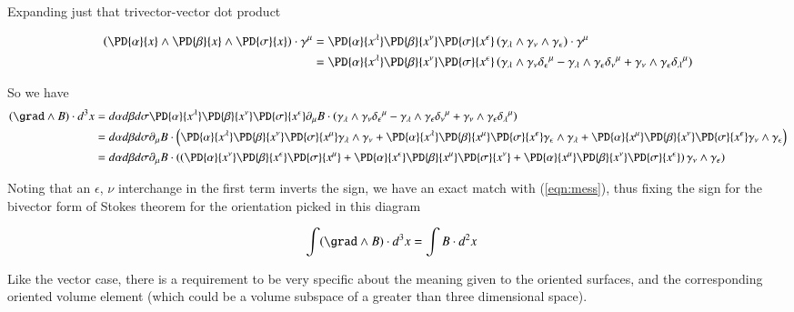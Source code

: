 Expanding just that trivector-vector dot product

\begin{align*}
\left( \PD{\alpha}{x} \wedge \PD{\beta}{x} \wedge \PD{\sigma}{x} \right) \cdot \gamma^\mu &= \PD{\alpha}{x^\lambda} \PD{\beta}{x^\nu} \PD{\sigma}{x^\epsilon} \left( \gamma_\lambda \wedge \gamma_\nu \wedge \gamma_\epsilon \right) \cdot \gamma^\mu  \\ &= \PD{\alpha}{x^\lambda} \PD{\beta}{x^\nu} \PD{\sigma}{x^\epsilon} \left( \gamma_\lambda \wedge \gamma_\nu {\delta_\epsilon}^\mu -\gamma_\lambda \wedge \gamma_\epsilon {\delta_\nu}^\mu +\gamma_\nu \wedge \gamma_\epsilon {\delta_\lambda}^\mu \right) 
\end{align*}

So we have
\begin{align*}
(\grad \wedge B) \cdot d^3 x &= d\alpha d\beta d\sigma \PD{\alpha}{x^\lambda} \PD{\beta}{x^\nu} \PD{\sigma}{x^\epsilon} \partial_\mu B \cdot \left( \gamma_\lambda \wedge \gamma_\nu {\delta_\epsilon}^\mu -\gamma_\lambda \wedge \gamma_\epsilon {\delta_\nu}^\mu +\gamma_\nu \wedge \gamma_\epsilon {\delta_\lambda}^\mu \right) \\ &= d\alpha d\beta d\sigma \partial_\mu B \cdot \left( \PD{\alpha}{x^\lambda} \PD{\beta}{x^\nu} \PD{\sigma}{x^\mu} \gamma_\lambda \wedge \gamma_\nu + \PD{\alpha}{x^\lambda} \PD{\beta}{x^\mu} \PD{\sigma}{x^\epsilon} \gamma_\epsilon \wedge \gamma_\lambda + \PD{\alpha}{x^\mu} \PD{\beta}{x^\nu} \PD{\sigma}{x^\epsilon} \gamma_\nu \wedge \gamma_\epsilon \right) \\ &= d\alpha d\beta d\sigma \partial_\mu B \cdot \left( \left( \PD{\alpha}{x^\nu} \PD{\beta}{x^\epsilon} \PD{\sigma}{x^\mu} + \PD{\alpha}{x^\epsilon} \PD{\beta}{x^\mu} \PD{\sigma}{x^\nu} + \PD{\alpha}{x^\mu} \PD{\beta}{x^\nu} \PD{\sigma}{x^\epsilon} \right) \gamma_\nu \wedge \gamma_\epsilon \right) \\
\end{align*}

Noting that an $\epsilon$, $\nu$ interchange in the first term inverts the sign, we have an exact match with (\ref{eqn:mess}), thus fixing the sign for the bivector form of Stokes theorem for the orientation picked in this diagram

\begin{align}
\int (\grad \wedge B) \cdot d^3 x &= \int B \cdot d^2 x
\end{align}

Like the vector case, there is a requirement to be very specific about the meaning given to the oriented surfaces, and the corresponding oriented volume element (which could be a volume subspace of a greater than three dimensional space).

\EndNoBibArticle
